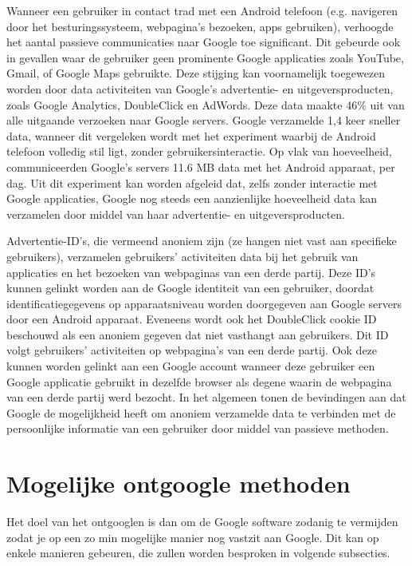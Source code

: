 Wanneer een gebruiker in contact trad met een Android telefoon (e.g. navigeren door het besturingssysteem, webpagina's bezoeken, apps gebruiken), verhoogde het aantal passieve communicaties naar Google toe significant. Dit gebeurde ook in gevallen waar de gebruiker geen prominente Google applicaties zoals YouTube, Gmail, of Google Maps gebruikte. Deze stijging kan voornamelijk toegewezen worden door data activiteiten van Google's advertentie- en uitgeversproducten, zoals Google Analytics, DoubleClick en AdWords. Deze data maakte 46\% uit van alle uitgaande verzoeken naar Google servers. Google verzamelde 1,4 keer sneller data, wanneer dit vergeleken wordt met het experiment waarbij de Android telefoon volledig stil ligt, zonder gebruikersinteractie. Op vlak van hoeveelheid, communiceerden Google's servers 11.6 MB data met het Android apparaat, per dag. Uit dit experiment kan worden afgeleid dat, zelfs zonder interactie met Google applicaties, Google nog steeds een aanzienlijke hoeveelheid data kan verzamelen door middel van haar advertentie- en uitgeversproducten.

Advertentie-ID's, die vermeend anoniem zijn (ze hangen niet vast aan specifieke gebruikers), verzamelen  gebruikers' activiteiten data bij het gebruik van applicaties en het bezoeken van webpaginas van een derde partij. Deze ID's kunnen gelinkt worden aan de Google identiteit van een gebruiker, doordat identificatiegegevens op apparaatsniveau worden doorgegeven aan Google servers door een Android apparaat. Eveneens wordt ook het DoubleClick cookie ID beschouwd als een anoniem gegeven dat niet vasthangt aan gebruikers. Dit ID volgt gebruikers' activiteiten op webpagina's van een derde partij. Ook deze kunnen worden gelinkt aan een Google account wanneer deze gebruiker een Google applicatie gebruikt in dezelfde browser als degene waarin de webpagina van een derde partij werd bezocht. In het algemeen tonen de bevindingen aan dat Google de mogelijkheid heeft om anoniem verzamelde data te verbinden met de persoonlijke informatie van een gebruiker door middel van passieve methoden.

\section{Mogelijke ontgoogle methoden}

Het doel van het ontgooglen is dan om de Google software zodanig te vermijden zodat je op  een zo min mogelijke manier nog vastzit aan Google. Dit kan op enkele manieren gebeuren, die zullen worden besproken in volgende subsecties.

